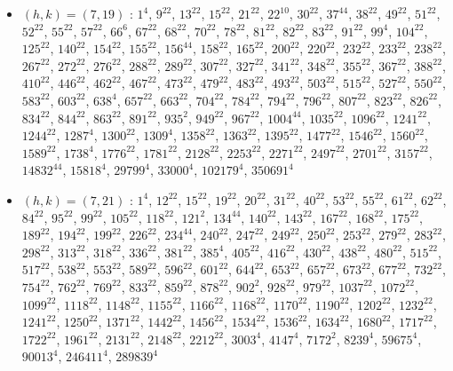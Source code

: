 \begin{itemize}
\item $(h,k)=(7,19)$ : $1^{4}$, $9^{22}$, $13^{22}$, $15^{22}$, $21^{22}$, $22^{10}$, $30^{22}$, $37^{44}$, $38^{22}$, $49^{22}$, $51^{22}$, $52^{22}$, $55^{22}$, $57^{22}$, $66^{6}$, $67^{22}$, $68^{22}$, $70^{22}$, $78^{22}$, $81^{22}$, $82^{22}$, $83^{22}$, $91^{22}$, $99^{4}$, $104^{22}$, $125^{22}$, $140^{22}$, $154^{22}$, $155^{22}$, $156^{44}$, $158^{22}$, $165^{22}$, $200^{22}$, $220^{22}$, $232^{22}$, $233^{22}$, $238^{22}$, $267^{22}$, $272^{22}$, $276^{22}$, $288^{22}$, $289^{22}$, $307^{22}$, $327^{22}$, $341^{22}$, $348^{22}$, $355^{22}$, $367^{22}$, $388^{22}$, $410^{22}$, $446^{22}$, $462^{22}$, $467^{22}$, $473^{22}$, $479^{22}$, $483^{22}$, $493^{22}$, $503^{22}$, $515^{22}$, $527^{22}$, $550^{22}$, $583^{22}$, $603^{22}$, $638^{4}$, $657^{22}$, $663^{22}$, $704^{22}$, $784^{22}$, $794^{22}$, $796^{22}$, $807^{22}$, $823^{22}$, $826^{22}$, $834^{22}$, $844^{22}$, $863^{22}$, $891^{22}$, $935^{2}$, $949^{22}$, $967^{22}$, $1004^{44}$, $1035^{22}$, $1096^{22}$, $1241^{22}$, $1244^{22}$, $1287^{4}$, $1300^{22}$, $1309^{4}$, $1358^{22}$, $1363^{22}$, $1395^{22}$, $1477^{22}$, $1546^{22}$, $1560^{22}$, $1589^{22}$, $1738^{4}$, $1776^{22}$, $1781^{22}$, $2128^{22}$, $2253^{22}$, $2271^{22}$, $2497^{22}$, $2701^{22}$, $3157^{22}$, $14832^{44}$, $15818^{4}$, $29799^{4}$, $33000^{4}$, $102179^{4}$, $350691^{4}$
\item $(h,k)=(7,21)$ : $1^{4}$, $12^{22}$, $15^{22}$, $19^{22}$, $20^{22}$, $31^{22}$, $40^{22}$, $53^{22}$, $55^{22}$, $61^{22}$, $62^{22}$, $84^{22}$, $95^{22}$, $99^{22}$, $105^{22}$, $118^{22}$, $121^{2}$, $134^{44}$, $140^{22}$, $143^{22}$, $167^{22}$, $168^{22}$, $175^{22}$, $189^{22}$, $194^{22}$, $199^{22}$, $226^{22}$, $234^{44}$, $240^{22}$, $247^{22}$, $249^{22}$, $250^{22}$, $253^{22}$, $279^{22}$, $283^{22}$, $298^{22}$, $313^{22}$, $318^{22}$, $336^{22}$, $381^{22}$, $385^{4}$, $405^{22}$, $416^{22}$, $430^{22}$, $438^{22}$, $480^{22}$, $515^{22}$, $517^{22}$, $538^{22}$, $553^{22}$, $589^{22}$, $596^{22}$, $601^{22}$, $644^{22}$, $653^{22}$, $657^{22}$, $673^{22}$, $677^{22}$, $732^{22}$, $754^{22}$, $762^{22}$, $769^{22}$, $833^{22}$, $859^{22}$, $878^{22}$, $902^{2}$, $928^{22}$, $979^{22}$, $1037^{22}$, $1072^{22}$, $1099^{22}$, $1118^{22}$, $1148^{22}$, $1155^{22}$, $1166^{22}$, $1168^{22}$, $1170^{22}$, $1190^{22}$, $1202^{22}$, $1232^{22}$, $1241^{22}$, $1250^{22}$, $1371^{22}$, $1442^{22}$, $1456^{22}$, $1534^{22}$, $1536^{22}$, $1634^{22}$, $1680^{22}$, $1717^{22}$, $1722^{22}$, $1961^{22}$, $2131^{22}$, $2148^{22}$, $2212^{22}$, $3003^{4}$, $4147^{4}$, $7172^{2}$, $8239^{4}$, $59675^{4}$, $90013^{4}$, $246411^{4}$, $289839^{4}$

\end{itemize}
